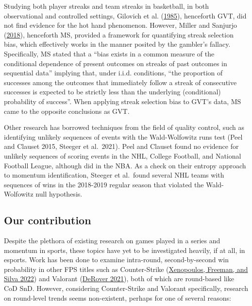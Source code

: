 \documentclass{article}
\begin{document}
Studying both player streaks and team streaks in basketball, in both
observational and controlled settings, Gilovich et al.
(\protect\hyperlink{ref-gilovich1985}{1985}), henceforth GVT, did not
find evidence for the hot hand phenomenon. However, Miller and Sanjurjo
(\protect\hyperlink{ref-miller2018}{2018}), henceforth MS, provided a
framework for quantifying streak selection bias, which effectively works
in the manner posited by the gambler's fallacy. Specifically, MS stated
that a ``bias exists in a common measure of the conditional dependence
of present outcomes on streaks of past outcomes in sequential data''
implying that, under i.i.d. conditions, ``the proportion of successes
among the outcomes that immediately follow a streak of consecutive
successes is expected to be strictly less than the underlying
(conditional) probability of success''. When applying streak selection
bias to GVT's data, MS came to the opposite conclusions as GVT.

Other research has borrowed techniques from the field of quality
control, such as identifying unlikely sequences of events with the
Wald-Wolfowitz runs test (Peel and Clauset 2015, Steeger et al.~2021).
Peel and Clauset found no evidence for unlikely sequences of scoring
events in the NHL, College Football, and National Football League,
although did in the NBA. As a check on their entropy approach to
momentum identification, Steeger et al.~found several NHL teams with
sequences of wins in the 2018-2019 regular season that violated the
Wald-Wolfowitz null hypothesis.

\hypertarget{our-contribution}{%
\subsection{Our contribution}\label{our-contribution}}

Despite the plethora of existing research on games played in a series
and momentum in sports, these topics have yet to be investigated
heavily, if at all, in esports. Work has been done to examine
intra-round, second-by-second win probability in other FPS titles such
as Counter-Strike (\protect\hyperlink{ref-xenopoulos2022}{Xenopoulos,
Freeman, and Silva 2022}) and Valorant
(\protect\hyperlink{ref-derover2021}{DeRover 2021}), both of which are
round-based like CoD SnD. However, considering Counter-Strike and
Valorant specifically, research on round-level trends seems
non-existent, perhaps for one of several reasons:
\end{document}

